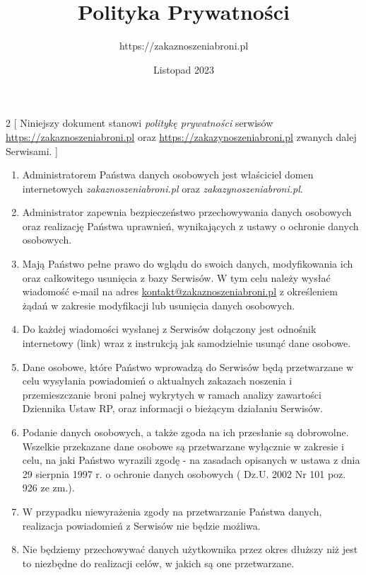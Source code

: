 \documentclass[a4paper,10pt]{article}
\title{Polityka Prywatności}
\author{https://zakaznoszeniabroni.pl}
\date{Listopad 2023}
\begin{document}
	\maketitle

	\begin{multicols}{2}
		[
		\noindent Niniejszy dokument stanowi \textit{politykę prywatności} serwisów \url{https://zakaznoszeniabroni.pl} oraz \url{https://zakazynoszeniabroni.pl} zwanych dalej Serwisami.
		]
		\begin{enumerate}
			\item Administratorem Państwa danych osobowych jest właściciel domen internetowych \textit{zakaznoszeniabroni.pl} oraz \textit{zakazynoszeniabroni.pl}.

			\item Administrator zapewnia bezpieczeństwo przechowywania danych osobowych oraz realizację Państwa uprawnień, wynikających z ustawy o ochronie danych osobowych.

			\item Mają Państwo pełne prawo do wglądu do swoich danych, modyfikowania ich oraz całkowitego usunięcia z bazy Serwisów. W tym celu należy wysłać wiadomość e-mail na adres \url{kontakt@zakaznoszeniabroni.pl} z określeniem żądań w zakresie modyfikacji lub usunięcia danych osobowych.

			\item Do każdej wiadomości wysłanej z Serwisów dołączony jest odnośnik internetowy (link) wraz z instrukcją jak samodzielnie usunąć dane osobowe.

			\item Dane osobowe, które Państwo wprowadzą do Serwisów będą przetwarzane w celu wysyłania powiadomień o aktualnych zakazach noszenia i przemieszczanie broni palnej wykrytych w ramach analizy zawartości Dziennika Ustaw RP, oraz informacji o bieżącym działaniu Serwisów.

			\item Podanie danych osobowych, a także zgoda na ich przesłanie są dobrowolne. Wszelkie przekazane dane osobowe są przetwarzane wyłącznie w zakresie i celu, na jaki Państwo wyrazili zgodę - na zasadach opisanych w ustawa z dnia 29 sierpnia 1997 r. o ochronie danych osobowych ( Dz.U. 2002 Nr 101 poz. 926 ze zm.).

			\item W przypadku niewyrażenia zgody na przetwarzanie Państwa danych, realizacja powiadomień z Serwisów nie będzie możliwa.

			\item Nie będziemy przechowywać danych użytkownika przez okres dłuższy niż jest to niezbędne do realizacji celów, w jakich są one przetwarzane.


\end{enumerate}
\end{multicols}
\end{document}
